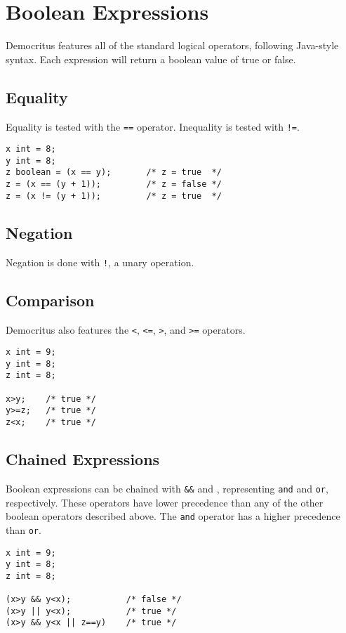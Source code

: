 	\section{Boolean Expressions}
		Democritus features all of the standard logical operators, following Java-style syntax. Each expression will return a boolean value of true or false.

        \subsection{Equality}
            Equality is tested with the \texttt{==} operator. Inequality is tested with \texttt{!=}. 
            \begin{lstlisting}
x int = 8;
y int = 8;
z boolean = (x == y);		/* z = true  */
z = (x == (y + 1));			/* z = false */
z = (x != (y + 1));			/* z = true  */
			\end{lstlisting}
			
		\subsection{Negation}
			Negation is done with \texttt{!}, a unary operation.

        \subsection{Comparison}
            Democritus also features the \texttt{\textless}, \texttt{\textless =}, \texttt{\textgreater}, and \texttt{\textgreater =} operators.  
            
            \begin{lstlisting}
x int = 9;
y int = 8;
z int = 8;

x>y;    /* true */
y>=z;   /* true */
z<x;    /* true */
            \end{lstlisting}

        \subsection{Chained Expressions}
            Boolean expressions can be chained with \texttt{\&\&} and \texttt{\textbar\textbar}, representing \texttt{and} and \texttt{or}, respectively. These operators have lower precedence than any of the other boolean operators described above. The \texttt{and} operator has a higher precedence than \texttt{or}.

            \begin{lstlisting}
x int = 9;
y int = 8;
z int = 8;

(x>y && y<x);			/* false */
(x>y || y<x);			/* true */
(x>y && y<x || z==y)	/* true */
            \end{lstlisting}
            
